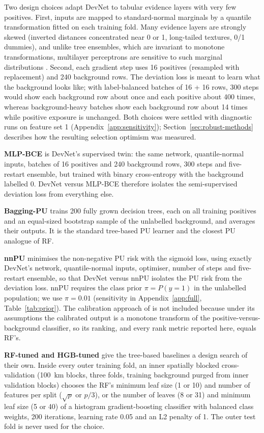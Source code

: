 \documentclass[pdflatex,sn-apa]{sn-jnl}
\begin{document}
Two design choices adapt DevNet to tabular evidence layers with very few positives. First, inputs are mapped to standard-normal marginals by a quantile transformation fitted on each training fold. Many evidence layers are strongly skewed (inverted distances concentrated near 0 or 1, long-tailed textures, 0/1 dummies), and unlike tree ensembles, which are invariant to monotone transformations, multilayer perceptrons are sensitive to such marginal distributions \citep{Gorishniy2021,Grinsztajn2022}. Second, each gradient step uses 16 positives (resampled with replacement) and 240 background rows. The deviation loss is meant to learn what the background looks like; with label-balanced batches of 16 + 16 rows, 300 steps would show each background row about once and each positive about 400 times, whereas background-heavy batches show each background row about 14 times while positive exposure is unchanged. Both choices were settled with diagnostic runs on feature set 1 (Appendix~\ref{app:sensitivity}); Section~\ref{sec:robust-methods} describes how the resulting selection optimism was measured.

\textbf{MLP-BCE} is DevNet's supervised twin: the same network, quantile-normal inputs, batches of 16 positives and 240 background rows, 300 steps and five-restart ensemble, but trained with binary cross-entropy with the background labelled 0. DevNet versus MLP-BCE therefore isolates the semi-supervised deviation loss from everything else.

\textbf{Bagging-PU} \citep{Mordelet2014} trains 200 fully grown decision trees, each on all training positives and an equal-sized bootstrap sample of the unlabelled background, and averages their outputs. It is the standard tree-based PU learner and the closest PU analogue of RF.

\textbf{nnPU} \citep{Kiryo2017} minimises the non-negative PU risk with the sigmoid loss, using exactly DevNet's network, quantile-normal inputs, optimiser, number of steps and five-restart ensemble, so that DevNet versus nnPU isolates the PU risk from the deviation loss. nnPU requires the class prior $\pi = P(y=1)$ in the unlabelled population; we use $\pi = 0.01$ (sensitivity in Appendix~\ref{app:full}, Table~\ref{tab:prior}). The calibration approach of \citet{Elkan2008} is not included because under its assumptions the calibrated output is a monotone transform of the positive-versus-background classifier, so its ranking, and every rank metric reported here, equals RF's.

\textbf{RF-tuned and HGB-tuned} give the tree-based baselines a design search of their own. Inside every outer training fold, an inner spatially blocked cross-validation (100~km blocks, three folds, training background purged from inner validation blocks) chooses the RF's minimum leaf size (1 or 10) and number of features per split ($\sqrt{p}$ or $p/3$), or the number of leaves (8 or 31) and minimum leaf size (5 or 40) of a histogram gradient-boosting classifier \citep{Pedregosa2011} with balanced class weights, 200 iterations, learning rate 0.05 and an L2 penalty of 1. The outer test fold is never used for the choice.
\end{document}
